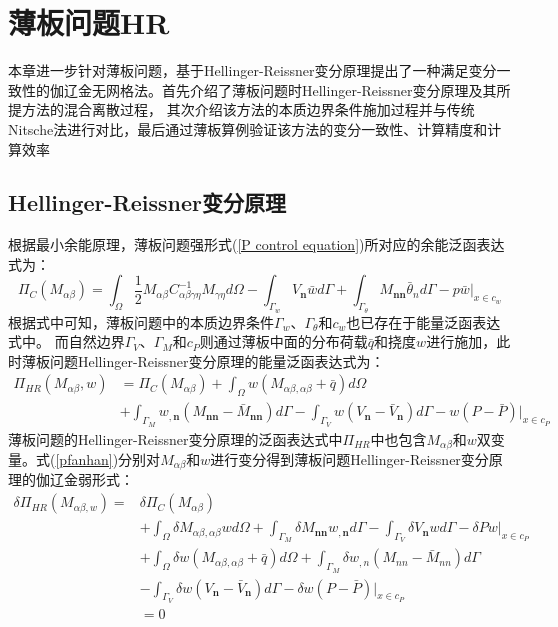 \chapter{薄板问题HR}
本章进一步针对薄板问题，基于Hellinger-Reissner变分原理提出了一种满足变分一致性的伽辽金无网格法。首先介绍了薄板问题时Hellinger-Reissner变分原理及其所提方法的混合离散过程，
其次介绍该方法的本质边界条件施加过程并与传统Nitsche法进行对比，最后通过薄板算例验证该方法的变分一致性、计算精度和计算效率
\section{Hellinger-Reissner变分原理}
根据最小余能原理，薄板问题强形式(\ref{P control equation})所对应的余能泛函表达式为：
\begin{equation}
\Pi_C(M_{\alpha\beta})=\int_{\Omega}\frac{1}{2}M_{\alpha\beta}C^{-1}_{\alpha\beta\gamma\eta}M_{\gamma\eta}d\Omega-\int_{\Gamma_w}V_{\pmb n}\bar{w}d\Gamma+\int_{\Gamma_{\theta}}M_{\pmb{nn}}\bar{\theta}_nd\Gamma-p\bar{w}\vert_{x\in{c_w}}
\end{equation}
根据式中可知，薄板问题中的本质边界条件$\Gamma_w$、$\Gamma_\theta$和$c_w$也已存在于能量泛函表达式中。
而自然边界$\Gamma_V$、$\Gamma_M$和$c_P$则通过薄板中面的分布荷载$\bar{q}$和挠度$w$进行施加，此时薄板问题Hellinger-Reissner变分原理的能量泛函表达式为：
\begin{equation}\label{pfanhan}
\begin{split}
    \Pi_{H\!R}(M_{\alpha\beta},w)&=\Pi_C(M_{\alpha\beta})+\int_{\Omega}w(M_{\alpha\beta,\alpha\beta}+\bar{q})d\Omega\\
    &+\int_{\Gamma_M}w_{,\pmb n}(M_{\pmb{nn}}-\bar{M}_{\pmb{nn}})d\Gamma
    -\int_{\Gamma_V}w(V_{\pmb n}-\bar{V}_{\pmb n})d\Gamma-w(P-\bar{P})\vert_{x\in{c_P}}
\end{split}
\end{equation}
薄板问题的Hellinger-Reissner变分原理的泛函表达式中$\Pi_{H\!R}$中也包含$M_{\alpha\beta}$和$w$双变量。式(\ref{pfanhan})分别对$M_{\alpha\beta}$和$w$进行变分得到薄板问题Hellinger-Reissner变分原理的伽辽金弱形式：
\newpage
\begin{equation}\label{Pweakfrom}
\begin{split}
    \delta\Pi_{H\!R}(M_{\alpha\beta,w})=&\delta\Pi_C(M_{\alpha\beta})\\
    &+\int_{\Omega}\delta M_{\alpha\beta,\alpha\beta}wd\Omega+\int_{\Gamma_M}\delta M_{\pmb{nn}}w_{,\pmb n}d\Gamma-\int_{\Gamma_V}\delta V_{\pmb n}wd\Gamma-\delta Pw\vert_{x\in{c_P}}\\
    &+\int_{\Omega}\delta w(M_{\alpha\beta,\alpha\beta}+\bar{q})d\Omega+\int_{\Gamma_M}\delta w_{,n}(M_{nn}-\bar{M}_{nn})d\Gamma\\
    &-\int_{\Gamma_V}\delta w(V_{\pmb n}-\bar{V}_{\pmb n})d\Gamma-\delta w(P-\bar{P})\vert_{x\in{c_P}}\\
    &=0
\end{split}
\end{equation}\par
